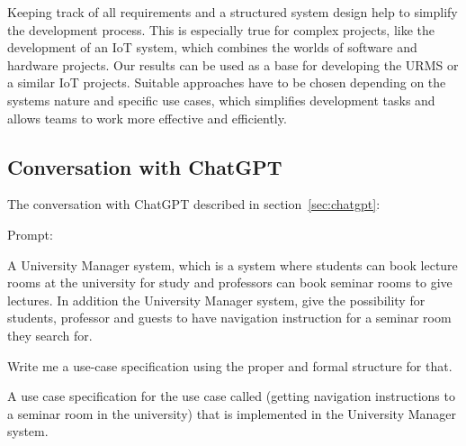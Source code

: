 \documentclass[article,onecolumn]{IEEEtran}
\begin{document}
Keeping track of all requirements and a structured system design help to simplify the development process. This is especially true for complex projects, like the development of an IoT system, which combines the worlds of software and hardware projects.
Our results can be used as a base for developing the URMS or a similar IoT projects. Suitable approaches have to be chosen depending on the systems nature and specific use cases, which simplifies development tasks and allows teams to work more effective and efficiently.

\newpage



\newpage
\appendix

\subsection{Conversation with ChatGPT} \label{appdx:chatgpt}
 
The conversation with ChatGPT described in section~\ref{sec:chatgpt}:

Prompt:
\begin{framed}
	\small
	A University Manager system, which is a system where students can book lecture rooms at the university for study and professors can book seminar rooms to give lectures. In addition the University Manager system, give the possibility for students, professor and guests  to have navigation instruction for a seminar room they search for.
	
	Write me a use-case specification using the proper and formal structure for that.
	
	A use case specification for the use case called (getting navigation instructions to a seminar room in the university) that is implemented in the University Manager system.
\end{framed}
\end{document}

